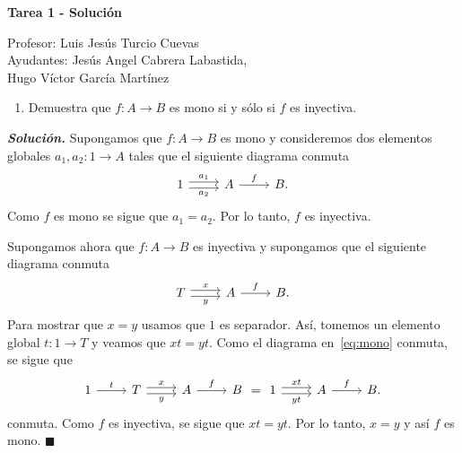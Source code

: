 \documentclass[12pt]{article}
\newcounter{A}
\newenvironment{ejercicio}{\begin{enumerate}[\bfseries \text{EJ \theA}.]\item}{\end{enumerate}\stepcounter{A}}
\newcommand{\QED}{\hfill\ensuremath{\blacksquare}}
\begin{document}
	\begin{center}
		\Huge \textbf{Tarea 1 - Solución}
	\end{center}
    \begin{flushright}
        \footnotesize Profesor: Luis Jesús Turcio Cuevas \\
		Ayudantes: Jesús Angel Cabrera Labastida, \\
		Hugo Víctor García Martínez
	\end{flushright}
    \normalsize

    \begin{ejercicio}
        Demuestra que \(f\colon A\to B\) es mono si y sólo si \(f\) es inyectiva.
    \end{ejercicio}

    \textbf{\textit{Solución.}} Supongamos que \(f\colon A\to B\) es mono y consideremos dos elementos
    globales \(a_1,a_2\colon 1\to A\) tales que el siguiente diagrama conmuta
    \begin{equation*}
      \begin{tikzcd}[ampersand replacement=\&]
        1\ar[shift left]{r}{a_1}\ar[shift right]{r}[swap]{a_2}\& A\ar{r}{f}\& B.
      \end{tikzcd}
    \end{equation*}
    Como \(f\) es mono se sigue que \(a_1=a_2\). Por lo tanto, \(f\) es inyectiva.
  
    Supongamos ahora que \(f\colon A\to B\) es inyectiva y supongamos que el
    siguiente diagrama conmuta
    \begin{equation}\label{eq:mono}
      \begin{tikzcd}[ampersand replacement=\&]
        T\ar[shift left]{r}{x}\ar[shift right]{r}[swap]{y}\& A\ar{r}{f}\& B.
      \end{tikzcd}
    \end{equation}
    Para mostrar que \(x=y\) usamos que \(1\) es separador. Así, tomemos un
    elemento global \(t\colon 1\to T\) y veamos que \(xt=yt\). Como el diagrama
    en~\eqref{eq:mono} conmuta, se sigue que
    \begin{equation*}
      \begin{tikzcd}[ampersand replacement=\&]
        1\ar{r}{t} \& T\ar[shift left]{r}{x}\ar[shift right]{r}[swap]{y}\& A\ar{r}{f}\& B
      \end{tikzcd}
      =
      \begin{tikzcd}[ampersand replacement=\&]
        1\ar[shift left]{r}{xt}\ar[shift right]{r}[swap]{yt}\& A\ar{r}{f}\& B.
      \end{tikzcd}
    \end{equation*}
    conmuta. Como \(f\) es inyectiva, se sigue que \(xt=yt\). Por lo tanto,
    \(x=y\) y así \(f\) es mono. \QED
    
\end{document}

